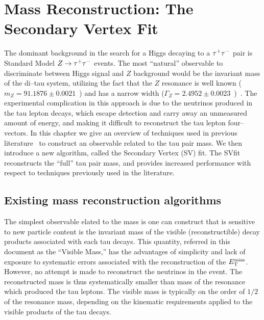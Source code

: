\ifx\master\undefined\fi
%
\newcommand{\mtau}{m_{\tau}}
\newcommand{\mnus}{m_{\nu\nu}}
\newcommand{\mvis}{m_{vis}}
%
\chapter{Mass Reconstruction: The Secondary Vertex Fit}
\label{ch:svfit}
%
The dominant background in the search for a Higgs decaying to a $\tau^+\tau^-$ pair is 
Standard Model $Z\to\tau^+\tau^-$ events.  The most ``natural'' observable to discriminate
between Higgs signal and $Z$ background would be the invariant mass of the
di--tau system, utilizing the fact that the $Z$ resonance is well known ($m_{Z}
= 91.1876 \pm 0.0021$~\GeVcc) and has a narrow width ($\Gamma_{Z} = 2.4952 \pm
0.0023$~\GeV)~\cite{PDG}.  The experimental complication in this approach is due
to the neutrinos produced in the tau lepton decays, which escape detection and
carry away an unmeasured amount of energy, and making it difficult to
reconstruct the tau lepton four--vectors.  In this chapter we give an overview
of techniques used in previous literature~\cite{Rainwater:1998kj,CDFMSSMHiggs, 
CMS-PTDRII} to construct an observable related to the tau pair mass.  We then
introduce a new algorithm, called the Secondary Vertex (SV) fit.  The SVfit
reconstructs the ``full'' tau pair mass, and provides increased performance with
respect to techniques previously used in the literature.
%
\section{Existing mass reconstruction algorithms}
%
The simplest observable elated to the \TT mass is one can construct that is
sensitive to new particle content is the invariant mass of the visible
(reconstructible) decay products associated with each tau decays.  This
quantity, referred in this document as the ``Visible Mass,'' has the advantages
of simplicity and lack of exposure to systematic errors associated with the
reconstruction of the $E_{\mathrm{T}}^{\text{miss}}$.  However, no attempt is made to reconstruct the
neutrinos in the event.  The reconstructed mass is thus systematically smaller
than mass of the resonance which produced the tau leptons.  The visible mass is
typically on the order of $1/2$ of the resonance mass, depending on the
kinematic requirements applied to the visible products of the tau decays. 

